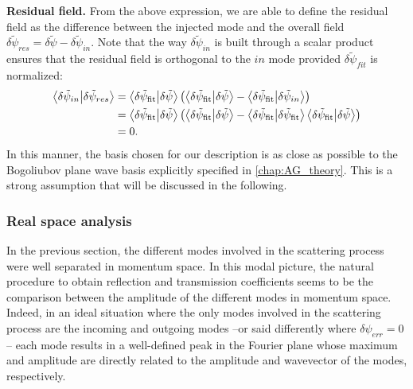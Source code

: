 \textbf{Residual field.} From the above expression, we are able to define the residual field as the difference between the injected mode and the overall field $\delta \tilde{\psi}_{res} = \delta \tilde{\psi}-\delta \tilde{\psi}_{in}$. 
Note that the way $\delta \tilde{\psi}_{in}$ is built through a scalar product ensures that the residual field is orthogonal to the $in$ mode provided $\delta \tilde{\psi}_{fit}$ is normalized:
\begin{equation}
    \begin{aligned}
    \bra{\delta \tilde{\psi}_{in}}\ket{\delta \tilde{\psi}_{res}} &=\bra{\delta \tilde{\psi}_{\mathrm{fit}}}\ket{\delta \tilde{\psi}} \left(\bra{\delta \tilde{\psi}_{\mathrm{fit}}}\ket{\delta \tilde{\psi}} - \bra{\delta \tilde{\psi}_{\mathrm{fit}}}\ket{\delta \tilde{\psi}_{in}}\right)\\
    &= \bra{\delta \tilde{\psi}_{\mathrm{fit}}}\ket{\delta \tilde{\psi}} \left(\bra{\delta \tilde{\psi}_{\mathrm{fit}}}\ket{\delta \tilde{\psi}}-\bra{\delta \tilde{\psi}_{\mathrm{fit}}}\ket{\delta \tilde{\psi}_{\mathrm{fit}}}\bra{\delta \tilde{\psi}_{\mathrm{fit}}}\ket{\delta \tilde{\psi}}\right)\\
    &=0.
    \end{aligned}
\end{equation}
In this manner, the basis chosen for our description is as close as possible to the Bogoliubov plane wave basis explicitly specified in \autoref{chap:AG_theory}. This is a strong assumption that will be discussed in the following. 


\subsubsection{Real space analysis}
In the previous section, the different modes involved in the scattering process were well separated in momentum space. In this modal picture, the natural procedure to obtain reflection and transmission coefficients seems
to be the comparison between the amplitude of the different modes in momentum space. Indeed, in an ideal situation where the only modes involved in the scattering process are the incoming and outgoing modes --or said differently where $\delta\psi_{err}=0$-- each mode results in a well-defined peak in the Fourier plane whose maximum and amplitude are directly related to the amplitude and wavevector of the modes, respectively. 


